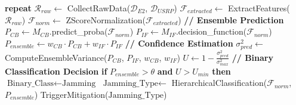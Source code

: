 \documentclass[journal]{IEEEtran}
\begin{document}
\begin{algorithm}[t]
\begin{algorithmic}[1]
\State \textbf{repeat} 
\State \hspace{\algorithmicindent} $\mathcal{R}_{raw} \leftarrow$ CollectRawData($\mathcal{D}_{E2}$, $\mathcal{D}_{USRP}$)
\State \hspace{\algorithmicindent} $\mathcal{F}_{extracted} \leftarrow$ ExtractFeatures($\mathcal{R}_{raw}$) 
\State \hspace{\algorithmicindent} $\mathcal{F}_{norm} \leftarrow$ ZScoreNormalization($\mathcal{F}_{extracted}$)
\State \hspace{\algorithmicindent} 
\State \hspace{\algorithmicindent} \textbf{// Ensemble Prediction}
\State \hspace{\algorithmicindent} $P_{CB} \leftarrow M_{CB}$.predict\_proba($\mathcal{F}_{norm}$)
\State \hspace{\algorithmicindent} $P_{IF} \leftarrow M_{IF}$.decision\_function($\mathcal{F}_{norm}$)
\State \hspace{\algorithmicindent} $P_{ensemble} \leftarrow w_{CB} \cdot P_{CB} + w_{IF} \cdot P_{IF}$
\State \hspace{\algorithmicindent} 
\State \hspace{\algorithmicindent} \textbf{// Confidence Estimation}
\State \hspace{\algorithmicindent} $\sigma^2_{pred} \leftarrow$ ComputeEnsembleVariance($P_{CB}$, $P_{IF}$, $w_{CB}$, $w_{IF}$)
\State \hspace{\algorithmicindent} $U \leftarrow 1 - \frac{\sigma^2_{pred}}{\sigma^2_{max}}$ 
\State \hspace{\algorithmicindent} 
\State \hspace{\algorithmicindent} \textbf{// Binary Classification Decision}
\State \hspace{\algorithmicindent} \textbf{if} $P_{ensemble} > \theta$ \textbf{and} $U > U_{min}$ \textbf{then}
\State \hspace{\algorithmicindent} \hspace{\algorithmicindent} $\text{Binary\_Class} \leftarrow \text{Jamming}$
\State \hspace{\algorithmicindent} \hspace{\algorithmicindent} $\text{Jamming\_Type} \leftarrow$ HierarchicalClassification($\mathcal{F}_{norm}$, $P_{ensemble}$)
\State \hspace{\algorithmicindent} \hspace{\algorithmicindent} TriggerMitigation($\text{Jamming\_Type}$)

\end{algorithmic}
\end{algorithm}
\end{document}
